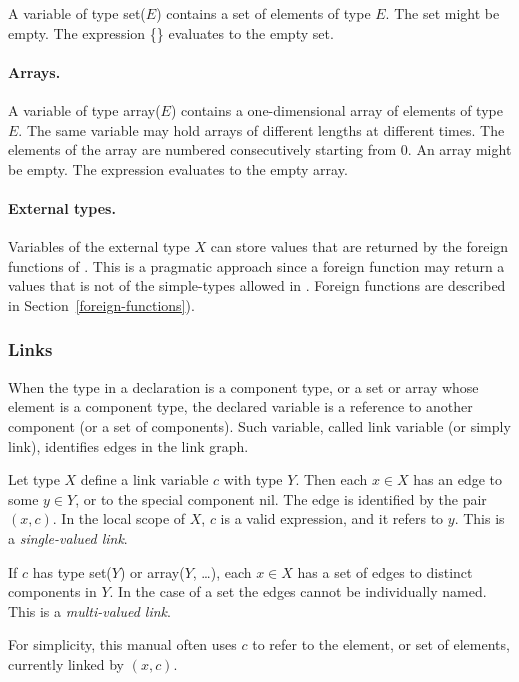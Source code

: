 A variable of type {\tok set($E$)} contains a set of elements of type
$E$. The set might be empty.  The expression {\tok \{\}} evaluates to
the empty set.

\paragraph{Arrays.}

A variable of type {\tok array($E$)} contains a one-dimensional array
of elements of type $E$.  The same variable may hold arrays of
different lengths at different times.  The elements of the array are
numbered consecutively starting from 0. An array might be empty. The
expression {\tok []} evaluates to the empty array.

\paragraph{External types.}

Variables of the external type $X$ can store values that are returned
by the foreign functions of \Shift{}.  This is a pragmatic approach
since a foreign function may return a values that is not of the {\nont
simple-types} allowed in \Shift{}.  Foreign functions are described in
Section~\ref{foreign-functions}).  

\subsubsection{Links}

When the type in a declaration is a component type, or a set or array
whose element is a component type, the declared variable is a
reference to another component (or a set of components).  Such
variable, called link variable (or simply link), identifies edges in
the link graph.

Let type $X$ define a link variable $c$ with type $Y$.
Then each $x \in X$ has an edge to some $y \in Y$, or to the
special component {\tok nil}.  The edge is identified by the pair $(x,
c)$.  In the local scope of $X$, $c$ is a valid
expression, and it refers to $y$.  This is a {\em single-valued
link}.  

If $c$ has type {\tok set($Y$)} or {\tok array($Y$, \ldots)}, each $x
\in X$ has a set of edges to distinct components in $Y$.  In the
case of a set the edges cannot be individually named.  This is
a {\em multi-valued link}.

For simplicity, this manual often uses $c$ to refer to the element, or
set of elements, currently linked by $(x, c)$.

